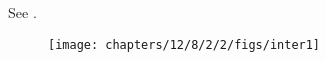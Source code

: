 See .
\begin{figure}[H]
	\begin{center} 
	    \texttt{[image: chapters/12/8/2/2/figs/inter1]}
	\end{center}
\caption{}
\label{fig:chapters/12/8/2/2/Fig1}
\end{figure}


















